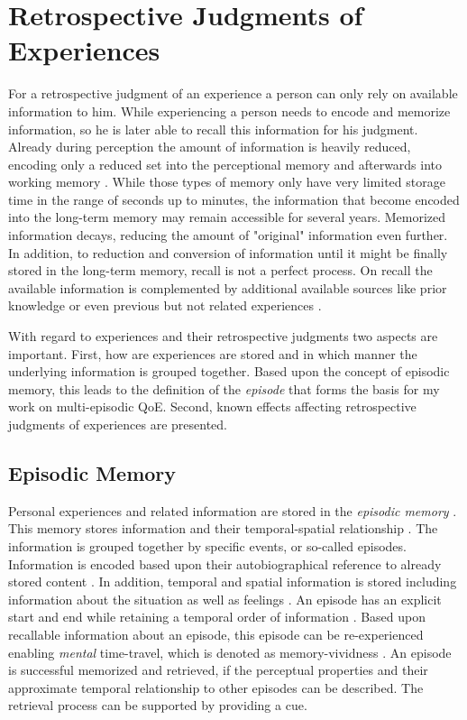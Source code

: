 \section{Retrospective Judgments of Experiences}\label{chap:03}
For a retrospective judgment of an experience a person can only rely on available information to him.
While experiencing a person needs to encode and memorize information, so he is later able to recall this information for his judgment.
Already during perception the amount of information is heavily reduced, encoding only a reduced set into the perceptional memory and afterwards into working memory \cite[\cf,][p. 8f.]{raake_speech_2006}.
While those types of memory only have very limited storage time in the range of seconds up to minutes, the information that become encoded into the long-term memory may remain accessible for several years.
Memorized information decays, reducing the amount of "original" information even further.
In addition, to reduction and conversion of information until it might be finally stored in the long-term memory, recall is not a perfect process.
On recall the available information is complemented by additional available sources like prior knowledge or even previous but not related experiences \citep[\cf,][]{schacter_seven_2003}.

With regard to experiences and their retrospective judgments two aspects are important.
First, how are experiences are stored and in which manner the underlying information is grouped together.
Based upon the concept of episodic memory, this leads to the definition of the \emph{episode} that forms the basis for my work on multi-episodic \ac{QoE}.
Second, known effects affecting retrospective judgments of experiences are presented.

\subsection{Episodic Memory}
Personal experiences and related information are stored in the \emph{episodic memory} \citep{tulving_episodic_1972}.
This memory stores information and their temporal-spatial relationship \citep[][p. 385]{tulving_episodic_1972}.
The information is grouped together by specific events, or so-called episodes.
Information is encoded based upon their autobiographical reference to already stored content \citep[][p. 385f.]{tulving_episodic_1972}.
In addition, temporal and spatial information is stored including information about the situation as well as feelings \citep[][p. 385f.]{tulving_episodic_1972}.
An episode has an explicit start and end while retaining a temporal order of information \citep[][p. 262]{conway_construction_2000}.
Based upon recallable information about an episode, this episode can be re-experienced enabling \emph{mental} time-travel, which is denoted as memory-vividness \citep{conway_construction_2000}.
An episode is successful memorized and retrieved, if the perceptual properties and their approximate temporal relationship to other episodes can be described.
The retrieval process can be supported by providing a cue.


